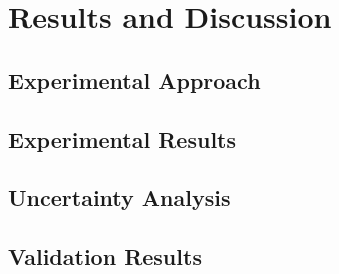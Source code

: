 \chapter{Results and Discussion} \label{cha:results}

\section{Experimental Approach} \label{sec:approach}

\section{Experimental Results} \label{sec:expresults}

\section{Uncertainty Analysis} \label{sec:uncertainty}

\section{Validation Results} \label{sec:validation}
